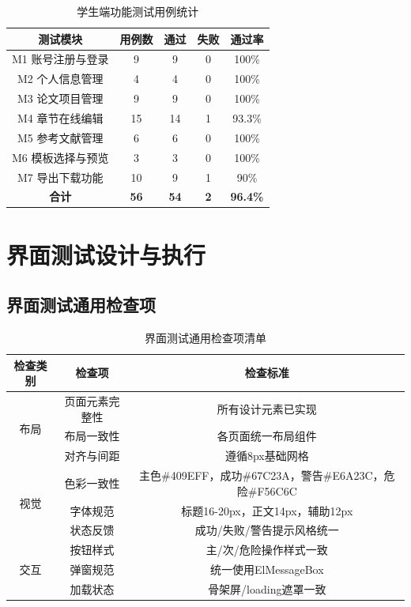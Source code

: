 \begin{table}[htbp]
    \centering
    \caption{学生端功能测试用例统计}
    \begin{tabular}{|c|c|c|c|c|}
        \hline
        \textbf{测试模块} & \textbf{用例数} & \textbf{通过} & \textbf{失败} & \textbf{通过率} \\
        \hline
        M1 账号注册与登录 & 9 & 9 & 0 & 100\% \\
        \hline
        M2 个人信息管理 & 4 & 4 & 0 & 100\% \\
        \hline
        M3 论文项目管理 & 9 & 9 & 0 & 100\% \\
        \hline
        M4 章节在线编辑 & 15 & 14 & 1 & 93.3\% \\
        \hline
        M5 参考文献管理 & 6 & 6 & 0 & 100\% \\
        \hline
        M6 模板选择与预览 & 3 & 3 & 0 & 100\% \\
        \hline
        M7 导出下载功能 & 10 & 9 & 1 & 90\% \\
        \hline
        \textbf{合计} & \textbf{56} & \textbf{54} & \textbf{2} & \textbf{96.4\%} \\
        \hline
    \end{tabular}
\end{table}

\section{界面测试设计与执行}

\subsection{界面测试通用检查项}

\begin{table}[htbp]
    \centering
    \caption{界面测试通用检查项清单}
    \begin{tabular}{|c|c|c|}
        \hline
        \textbf{检查类别} & \textbf{检查项} & \textbf{检查标准} \\
        \hline
        \multirow{3}{*}{布局} & 页面元素完整性 & 所有设计元素已实现 \\
        \cline{2-3}
        & 布局一致性 & 各页面统一布局组件 \\
        \cline{2-3}
        & 对齐与间距 & 遵循8px基础网格 \\
        \hline
        \multirow{3}{*}{视觉} & 色彩一致性 & 主色\#409EFF，成功\#67C23A，警告\#E6A23C，危险\#F56C6C \\
        \cline{2-3}
        & 字体规范 & 标题16-20px，正文14px，辅助12px \\
        \cline{2-3}
        & 状态反馈 & 成功/失败/警告提示风格统一 \\
        \hline
        \multirow{3}{*}{交互} & 按钮样式 & 主/次/危险操作样式一致 \\
        \cline{2-3}
        & 弹窗规范 & 统一使用ElMessageBox \\
        \cline{2-3}
        & 加载状态 & 骨架屏/loading遮罩一致 \\
        \hline
    \end{tabular}
\end{table}

